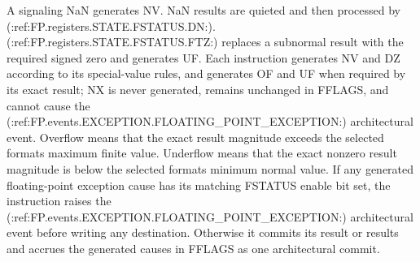 A signaling NaN generates NV. NaN results are quieted and then processed by (:ref:FP.registers.STATE.FSTATUS.DN:).
(:ref:FP.registers.STATE.FSTATUS.FTZ:) replaces a subnormal result with the required signed zero and generates UF. Each instruction
generates NV and DZ according to its special-value rules, and generates OF and UF when required by its exact result;
NX is never generated, remains unchanged in FFLAGS, and cannot cause the (:ref:FP.events.EXCEPTION.FLOATING_POINT_EXCEPTION:)
architectural event. Overflow means that the exact result magnitude exceeds the selected
format\textquotesingle{}s maximum finite value. Underflow means that the exact nonzero result magnitude is below the selected format\textquotesingle{}s
minimum normal value. If any generated floating-point exception cause has its matching FSTATUS enable bit set, the
instruction raises the (:ref:FP.events.EXCEPTION.FLOATING_POINT_EXCEPTION:) architectural event before writing any destination. Otherwise
it commits its result or results and accrues the generated causes in FFLAGS as one architectural commit.

\clearpage

